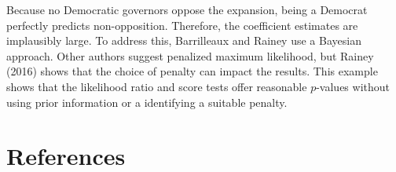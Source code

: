 \documentclass[
]{article}
\begin{document}
Because no Democratic governors oppose the expansion, being a Democrat
perfectly predicts non-opposition. Therefore, the coefficient estimates
are implausibly large. To address this, Barrilleaux and Rainey use a
Bayesian approach. Other authors suggest penalized maximum likelihood,
but Rainey (2016) shows that the choice of penalty can impact the
results. This example shows that the likelihood ratio and score tests
offer reasonable \(p\)-values without using prior information or a
identifying a suitable penalty.

\hypertarget{references}{%
\section{References}\label{references}}
\end{document}
